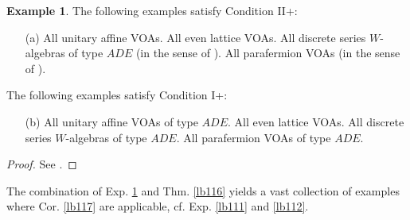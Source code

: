 \documentclass[11pt,b5paper,notitlepage]{article}
\theoremstyle{definition}
\newtheorem{eg}[df]{Example}
\theoremstyle{plain}
\numberwithin{equation}{section}
\begin{document}
\begin{eg}\label{lb118}
The following examples satisfy Condition II+:
\begin{itemize}
\item[(a)] All unitary affine VOAs. All even lattice VOAs. All discrete series $W$-algebras of type $ADE$ (in the sense of \cite{ACL19}).  All parafermion VOAs (in the sense of \cite{DR17}).
\end{itemize}
The following examples satisfy Condition I+:
\begin{itemize}
\item[(b)] All unitary affine VOAs of type $ADE$. All even lattice VOAs. All discrete series $W$-algebras of type $ADE$.  All parafermion VOAs of type $ADE$.
\end{itemize}
\end{eg}

\begin{proof}
See \cite[Sec. 2.7]{Gui20}.
\end{proof}


The combination of Exp. \ref{lb118} and Thm. \ref{lb116} yields a vast collection of examples where Cor. \ref{lb117} are applicable, cf. Exp. \ref{lb111} and \ref{lb112}.
\end{document}
